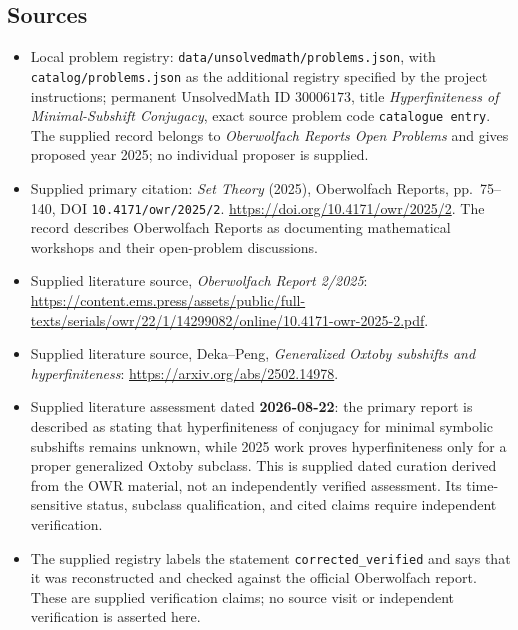 \documentclass[11pt]{article}
\begin{document}
\subsection{Sources}
\begin{itemize}
\item Local problem registry: \texttt{data/unsolvedmath/problems.json}, with \texttt{catalog/problems.json} as the additional registry specified by the project instructions; permanent UnsolvedMath ID \(30006173\), title \emph{Hyperfiniteness of Minimal-Subshift Conjugacy}, exact source problem code \texttt{catalogue entry}. The supplied record belongs to \emph{Oberwolfach Reports Open Problems} and gives proposed year 2025; no individual proposer is supplied.
\item Supplied primary citation: \emph{Set Theory} (2025), Oberwolfach Reports, pp.\ 75--140, DOI \texttt{10.4171/owr/2025/2}. \url{https://doi.org/10.4171/owr/2025/2}. The record describes Oberwolfach Reports as documenting mathematical workshops and their open-problem discussions.
\item Supplied literature source, \emph{Oberwolfach Report 2/2025}: \url{https://content.ems.press/assets/public/full-texts/serials/owr/22/1/14299082/online/10.4171-owr-2025-2.pdf}.
\item Supplied literature source, Deka--Peng, \emph{Generalized Oxtoby subshifts and hyperfiniteness}: \url{https://arxiv.org/abs/2502.14978}.
\item Supplied literature assessment dated \textbf{2026-08-22}: the primary report is described as stating that hyperfiniteness of conjugacy for minimal symbolic subshifts remains unknown, while 2025 work proves hyperfiniteness only for a proper generalized Oxtoby subclass. This is supplied dated curation derived from the OWR material, not an independently verified assessment. Its time-sensitive status, subclass qualification, and cited claims require independent verification.
\item The supplied registry labels the statement \texttt{corrected\_verified} and says that it was reconstructed and checked against the official Oberwolfach report. These are supplied verification claims; no source visit or independent verification is asserted here.
\end{itemize}
\end{document}
